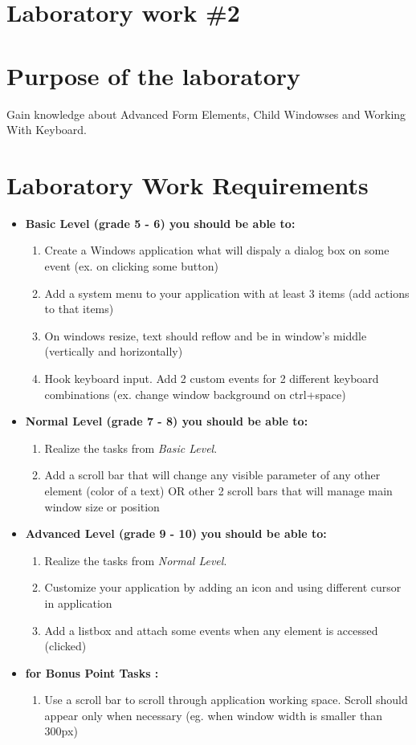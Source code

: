 \section*{Laboratory work \#2}

\section{Purpose of the laboratory}
Gain knowledge about Advanced Form Elements, Child Windowses and Working With Keyboard.
\section{Laboratory Work Requirements}
\begin{itemize}
\item \textbf{Basic Level (grade 5 - 6) you should be able to:}
	\begin{enumerate}
	\item Create a Windows application what will dispaly a dialog box on some event (ex. on clicking some button)
      \item Add a system menu to your application with at least 3 items (add actions to that items)
      \item On windows resize, text should reflow and be in window's middle (vertically and horizontally)
      \item Hook keyboard input. Add 2 custom events for 2 different keyboard combinations (ex. change window background on ctrl+space)
      \end{enumerate}
\item \textbf{Normal Level (grade 7 - 8) you should be able to:}
      \begin{enumerate}
    \item Realize the tasks from \textit{Basic Level}.
    \item Add a scroll bar that will change any visible parameter of any other element (color of a text) OR other 2 scroll bars that will manage main window size or position
          \end{enumerate}
\item \textbf{Advanced Level (grade 9 - 10) you should be able to:}
      \begin{enumerate}
    \item Realize the tasks from \textit{Normal Level}.
    \item Customize your application by adding an icon and using different cursor in application
    \item Add a listbox and attach some events when any element is accessed (clicked)
          \end{enumerate}
          \item \textbf{for Bonus Point Tasks :}
          \begin{enumerate}
          \item Use a scroll bar to scroll through application working space. Scroll should appear only when necessary (eg. when window width is smaller than 300px)
          \end{enumerate}
          
  \end{itemize}  

\clearpage